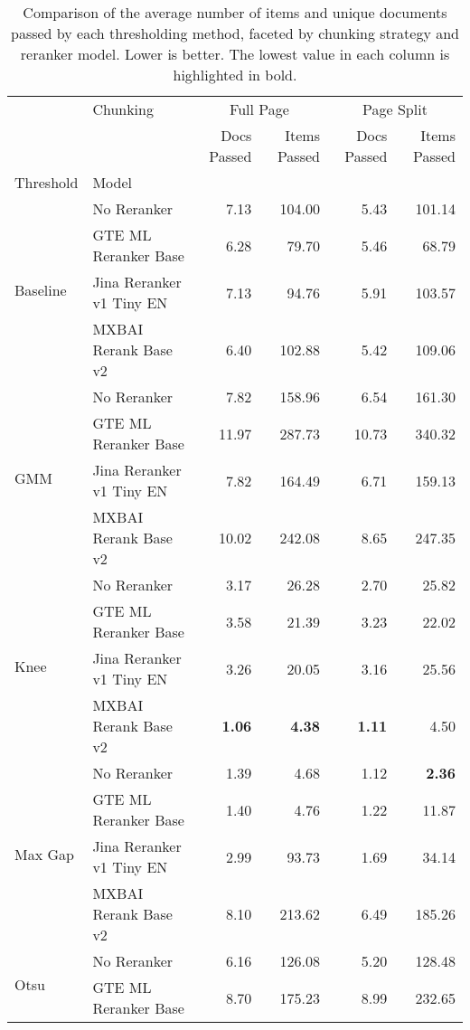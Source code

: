 \begin{table*}[htbp]
\centering
\footnotesize
\caption{Comparison of the average number of items and unique documents passed by each thresholding method, faceted by chunking strategy and reranker model. Lower is better. The lowest value in each column is highlighted in bold.}
\label{tab:merged_retrieval_stats}
\begin{tabular}{llrrrr}
\toprule
 & Chunking & \multicolumn{2}{c}{Full Page} & \multicolumn{2}{c}{Page Split} \\
 &  & Docs Passed & Items Passed & Docs Passed & Items Passed \\
Threshold & Model &  &  &  &  \\
\midrule
\multirow[t]{4}{*}{Baseline} & No Reranker & 7.13 & 104.00 & 5.43 & 101.14 \\
 & GTE ML Reranker Base & 6.28 & 79.70 & 5.46 & 68.79 \\
 & Jina Reranker v1 Tiny EN & 7.13 & 94.76 & 5.91 & 103.57 \\
 & MXBAI Rerank Base v2 & 6.40 & 102.88 & 5.42 & 109.06 \\
\cline{1-6}
\multirow[t]{4}{*}{GMM} & No Reranker & 7.82 & 158.96 & 6.54 & 161.30 \\
 & GTE ML Reranker Base & 11.97 & 287.73 & 10.73 & 340.32 \\
 & Jina Reranker v1 Tiny EN & 7.82 & 164.49 & 6.71 & 159.13 \\
 & MXBAI Rerank Base v2 & 10.02 & 242.08 & 8.65 & 247.35 \\
\cline{1-6}
\multirow[t]{4}{*}{Knee} & No Reranker & 3.17 & 26.28 & 2.70 & 25.82 \\
 & GTE ML Reranker Base & 3.58 & 21.39 & 3.23 & 22.02 \\
 & Jina Reranker v1 Tiny EN & 3.26 & 20.05 & 3.16 & 25.56 \\
 & MXBAI Rerank Base v2 & \textbf{1.06} & \textbf{4.38} & \textbf{1.11} & 4.50 \\
\cline{1-6}
\multirow[t]{4}{*}{Max Gap} & No Reranker & 1.39 & 4.68 & 1.12 & \textbf{2.36} \\
 & GTE ML Reranker Base & 1.40 & 4.76 & 1.22 & 11.87 \\
 & Jina Reranker v1 Tiny EN & 2.99 & 93.73 & 1.69 & 34.14 \\
 & MXBAI Rerank Base v2 & 8.10 & 213.62 & 6.49 & 185.26 \\
\cline{1-6}
\multirow[t]{4}{*}{Otsu} & No Reranker & 6.16 & 126.08 & 5.20 & 128.48 \\
 & GTE ML Reranker Base & 8.70 & 175.23 & 8.99 & 232.65 \\

\end{tabular}
\end{table*}
